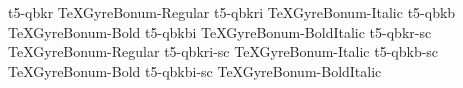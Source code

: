 \documentclass[test]{vnsample}
\begin{document}
\begin{shortsample}
    {t5-qbkr}     {TeXGyreBonum-Regular}
   {t5-qbkri}    {TeXGyreBonum-Italic}
    {t5-qbkb}     {TeXGyreBonum-Bold}
   {t5-qbkbi}    {TeXGyreBonum-BoldItalic}
   {t5-qbkr-sc}  {TeXGyreBonum-Regular}
 {t5-qbkri-sc} {TeXGyreBonum-Italic}
   {t5-qbkb-sc}  {TeXGyreBonum-Bold}
 {t5-qbkbi-sc} {TeXGyreBonum-BoldItalic}
\end{shortsample}
\end{document}
